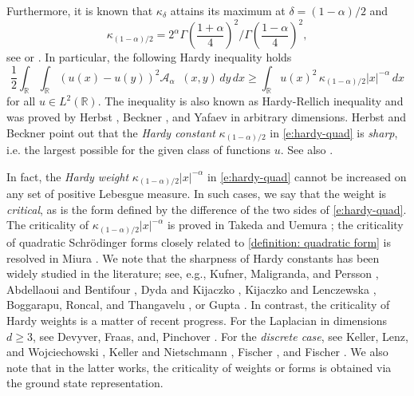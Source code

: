 \documentclass[12pt, a4paper]{amsart}
\DeclareMathOperator{\Mass}{\nu_{\alpha}}
\newcommand{\R}{\mathbb{R}}
\begin{document}
Furthermore, it is known that $\kappa_{\delta}$ 
 attains its  maximum  at
$\delta=(1-\alpha)/2$ and
\begin{equation}\label{e.mkb}
\kappa_{(1-\alpha)/2}=2^\alpha\Gamma\left(\frac{1+\alpha}{4}\right)^2/
\Gamma\left(\frac{1-\alpha}{4}\right)^{2},
\end{equation}
see \cite[Lemma 3.2]{MR2425175} or \cite[p.~237]{MR3460023}.
In particular,
the following Hardy inequality holds
\begin{equation}\label{e:hardy-quad}
\frac{1}{2} \int_{\R} \int_{\R} (u(x)-u(y))^2 \mathcal {A}_{\alpha}\Mass(x,y) \,dy \,dx \geq
\int_{\R} u(x)^2 \,\kappa_{(1-\alpha)/2}|x|^{-\alpha}\,dx
\end{equation}
for all $u \in L^2(\R)$.
The inequality is also known as Hardy-Rellich inequality and  was proved by Herbst \cite[(2.6)]{MR436854}, Beckner \cite[Theorem 2]{MR1254832}, and Yafaev \cite[Theorem 2.9]{MR1717839} in arbitrary dimensions. Herbst and Beckner point out that the \textit{Hardy constant} $\kappa_{(1-\alpha)/2}$ in \cref{e:hardy-quad} is \textit{sharp}, i.e. the largest possible for the given class of functions $u$. See also \cite[Subsection~2.1]{MR2425175}.

In fact,
the \textit{Hardy weight} $\kappa_{(1-\alpha)/2}|x|^{-\alpha}$ in \cref{e:hardy-quad} cannot be increased on any set of positive Lebesgue measure. 
In such cases, we say that the weight is \textit{critical}, as is the form defined by the difference of the two sides of \eqref{e:hardy-quad}.
The criticality of $\kappa_{(1-\alpha)/2}|x|^{-\alpha}$ is proved in Takeda and Uemura \cite[Example 5.9]{MR4586808};  the criticality of quadratic Schr\"odinger forms closely related to \eqref{definition: quadratic form} is resolved in Miura \cite{MR4585113}.
We note that the   sharpness of Hardy constants has been widely studied in the literature; see, e.g.,  Kufner, Maligranda, and Persson \cite{MR2256532}, Abdellaoui and Bentifour \cite{MR3626031}, Dyda and Kijaczko \cite{MR4705882}, Kijaczko and Lenczewska \cite{MR4720167}, Boggarapu, Roncal, and Thangavelu \cite{MR3962190}, or Gupta \cite{MR4531775}. In contrast, 
the criticality of Hardy weights is a matter of recent progress. For the Laplacian in dimensions $d\ge 3$, see Devyver, Fraas, and, Pinchover \cite[Example 3.1]{MR3170212}.
For the \textit{discrete case}, see Keller, Lenz, and Wojciechowski \cite[Chapter 9]{MR4412542}, Keller and Nietschmann \cite{MR4612316}, Fischer \cite{MR4768506}, and Fischer \cite{MR4597627}. We also note that in the latter works, the criticality of weights or forms is obtained via the ground state representation.
\end{document}
